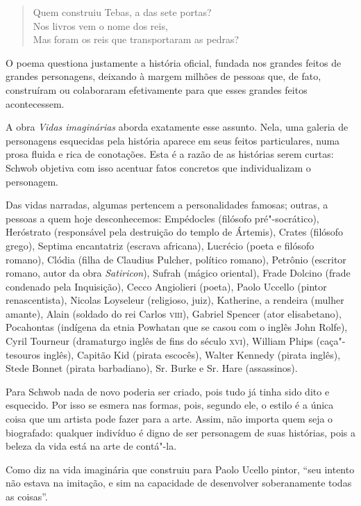 \documentclass[12pt]{extarticle}
\begin{document}
\begin{verse}
Quem construiu Tebas, a das sete portas?\\
Nos livros vem o nome dos reis,\\
Mas foram os reis que transportaram as pedras?\\
\end{verse}

O poema questiona justamente a história oficial, fundada nos grandes
feitos de grandes personagens, deixando à margem milhões de pessoas que,
de fato, construíram ou colaboraram efetivamente para que esses grandes
feitos acontecessem.

A obra \textit{Vidas imaginárias} aborda exatamente esse assunto. Nela, uma
galeria de personagens esquecidas pela história aparece em seus feitos
particulares, numa prosa fluida e rica de conotações. Esta é a razão de
as histórias serem curtas: Schwob objetiva com isso acentuar fatos
concretos que individualizam o personagem.

Das vidas narradas, algumas pertencem a personalidades famosas; outras,
a pessoas a quem hoje desconhecemos: Empédocles (filósofo
pré"-socrático), Heróstrato (responsável pela destruição do templo de
Ártemis), Crates (filósofo grego), Septima encantatriz (escrava
africana), Lucrécio (poeta e filósofo romano), Clódia (filha de Claudius
Pulcher, político romano), Petrônio (escritor romano, autor da obra
\textit{Satiricon}), Sufrah (mágico oriental), Frade Dolcino (frade condenado
pela Inquisição), Cecco Angiolieri (poeta), Paolo Uccello (pintor
renascentista), Nicolas Loyseleur (religioso, juiz), Katherine, a
rendeira (mulher amante), Alain (soldado do rei Carlos \textsc{viii}), Gabriel
Spencer (ator elisabetano), Pocahontas (indígena da etnia Powhatan que
se casou com o inglês John Rolfe), Cyril Tourneur (dramaturgo inglês de
fins do século \textsc{xvi}), William Phips (caça"-tesouros inglês), Capitão Kid
(pirata escocês), Walter Kennedy (pirata inglês), Stede Bonnet (pirata
barbadiano), Sr. Burke e Sr. Hare (assassinos).

Para Schwob nada de novo poderia ser criado, pois tudo já tinha sido
dito e esquecido. Por isso se esmera nas formas, pois, segundo ele, o
estilo é a única coisa que um artista pode fazer para a arte. Assim, não
importa quem seja o biografado: qualquer indivíduo é digno de ser
personagem de suas histórias, pois a beleza da vida está na arte de
contá"-la.

Como diz na vida imaginária que construiu para Paolo Ucello pintor,
``seu intento não estava na imitação, e sim na capacidade de desenvolver
soberanamente todas as coisas''.
\end{document}
